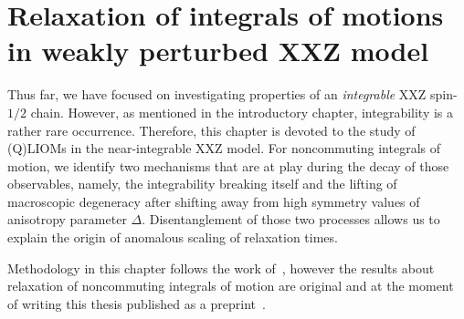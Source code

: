 \chapter{Relaxation of integrals of motions in weakly perturbed XXZ model\label{chap:decay}}
\thispagestyle{chapterBeginStyle}


Thus far, we have focused on investigating properties of an \emph{integrable} XXZ
spin-\(1/2\) chain. However, as mentioned in the introductory chapter,
integrability is a rather rare occurrence. Therefore, this chapter is devoted
to the study of (Q)LIOMs in the near-integrable XXZ model. For noncommuting integrals
of motion, we identify two mechanisms that are at play during the decay of those
observables, namely, the integrability breaking itself and the lifting of macroscopic
degeneracy after shifting away from high symmetry values of anisotropy parameter \(\Delta\).
Disentanglement of those two processes allows us to explain the origin of anomalous
scaling of relaxation times.

Methodology in this chapter follows the work of~\textcite{Mierzejewski2015Approx},
however the results about relaxation of noncommuting integrals
of motion are original and at the moment of writing this thesis published as
a preprint~\autocite{mierzejewski2021multiple}.
